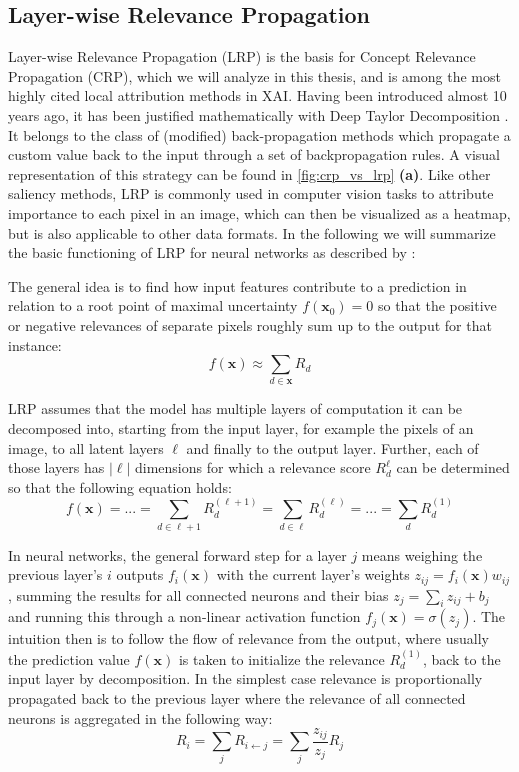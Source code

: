 \subsection{Layer-wise Relevance Propagation}\label{section:lrp}
Layer-wise Relevance Propagation (LRP) \citep{Bach2015} is the basis for Concept Relevance Propagation (CRP), which we will analyze in this thesis, and is among the most highly cited local attribution methods in XAI. Having been introduced almost 10 years ago, it has been justified mathematically with Deep Taylor Decomposition \citep{Montavon2017}. It belongs to the class of (modified) back-propagation methods which propagate a custom value back to the input through a set of backpropagation rules. A visual representation of this strategy can be found in \cref{fig:crp_vs_lrp} \textbf{(a)}. Like other saliency methods, LRP is commonly used in computer vision tasks to attribute importance to each pixel in an image, which can then be visualized as a heatmap, but is also applicable to other data formats. In the following we will summarize the basic functioning of LRP for neural networks as described by \cite{Bach2015}:

The general idea is to find how input features contribute to a prediction in relation to a root point of maximal uncertainty $f(\mathbf{x}_0) = 0$ so that the positive or negative relevances of separate pixels roughly sum up to the output for that instance:
\begin{equation}\displaystyle
    f(\mathbf{x}) \approx \sum_{d \in \mathbf{x}} R_d
\end{equation}

LRP assumes that the model has multiple layers of computation it can be decomposed into, starting from the input layer, for example the pixels of an image, to all latent layers $\ell$ and finally to the output layer. Further, each of those layers has $|\ell|$ dimensions for which a relevance score $R^{\ell}_d$ can be determined so that the following equation holds:
\begin{equation}
    f(\mathbf{x}) = ... = \sum_{d \in \ell+1} R^{(\ell+1)}_d =  \sum_{d \in \ell} R^{(\ell)}_d = ... =  \sum_{d} R^{(1)}_d
\end{equation}

In neural networks, the general forward step for a layer $j$ means weighing the previous layer's $i$ outputs $f_i(\mathbf{x})$ with the current layer's weights $z_{ij} = f_i(\mathbf{x}) w_{ij}$, summing the results for all connected neurons and their bias $z_{j} = \sum_{i} z_{ij} + b_j$ and running this through a non-linear activation function $f_j(\mathbf{x}) = \sigma (z_j)$.
The intuition then is to follow the flow of relevance from the output, where usually the prediction value $f(\mathbf{x})$ is taken to initialize the relevance $R^(1)_d$, back to the input layer by decomposition. In the simplest case relevance is proportionally propagated back to the previous layer where the relevance of all connected neurons is aggregated in the following way:
\begin{equation}\label{eq:basic_attribution_rule}
    R_i = \sum_{j}  R_{i \leftarrow j} = \sum_{j} \frac{z_{ij}}{z_j} R_j
\end{equation}

